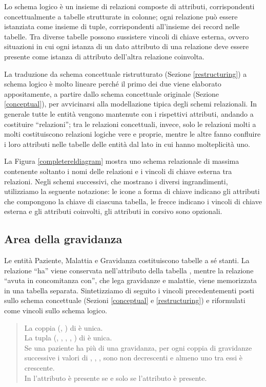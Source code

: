 Lo schema logico è un insieme di relazioni composte di attributi, corrispondenti concettualmente a tabelle strutturate in colonne; ogni relazione può essere istanziata come insieme di tuple, corrispondenti all'insieme dei record nelle tabelle.
Tra diverse tabelle possono sussistere vincoli di chiave esterna, ovvero situazioni in cui ogni istanza di un dato attributo di una relazione deve essere presente come istanza di attributo dell'altra relazione coinvolta.

La traduzione da schema concettuale ristrutturato (Sezione \ref{restructuring}) a schema logico è molto lineare perché il primo dei due viene elaborato appositamente, a partire dallo schema concettuale originale (Sezione \ref{conceptual}), per avvicinarsi alla modellazione tipica degli schemi relazionali.
In generale tutte le entità vengono mantenute con i rispettivi attributi, andando a costituire \enquote{relazioni}; tra le relazioni concettuali, invece, solo le relazioni molti a molti costituiscono relazioni logiche vere e proprie, mentre le altre fanno confluire i loro attributi nelle tabelle delle entità dal lato in cui hanno molteplicità uno.

La Figura \ref{completereldiagram} mostra uno schema relazionale di massima contenente soltanto i nomi delle relazioni e i vincoli di chiave esterna tra relazioni.
Negli schemi successivi, che mostrano i diversi ingrandimenti, utilizziamo la seguente notazione: le icone a forma di chiave indicano gli attributi che compongono la chiave di ciascuna tabella, le frecce indicano i vincoli di chiave esterna e gli attributi coinvolti, gli attributi in corsivo sono opzionali.

\subsection{Area della gravidanza}

Le entità Paziente, Malattia e Gravidanza costituiscono tabelle a sé stanti.
La relazione \enquote{ha} viene conservata nell'attributo  della tabella , mentre la relazione \enquote{avuta in concomitanza con}, che lega gravidanze e malattie, viene memorizzata in una tabella separata.
Sintetizziamo di seguito i vincoli precedentementi posti sullo schema concettuale (Sezioni \ref{conceptual} e \ref{restructuring}) e riformulati come vincoli sullo schema logico.
\begin{quote}
La coppia (, ) di  è unica. \\
La tupla (, , , , ) di  è unica. \\
Se una paziente ha più di una gravidanza, per ogni coppia di gravidanze successive i valori di , , ,  sono non decrescenti e almeno uno tra essi è crescente. \\
In  l'attributo  è presente se e solo se l'attributo  è presente.
\end{quote}

